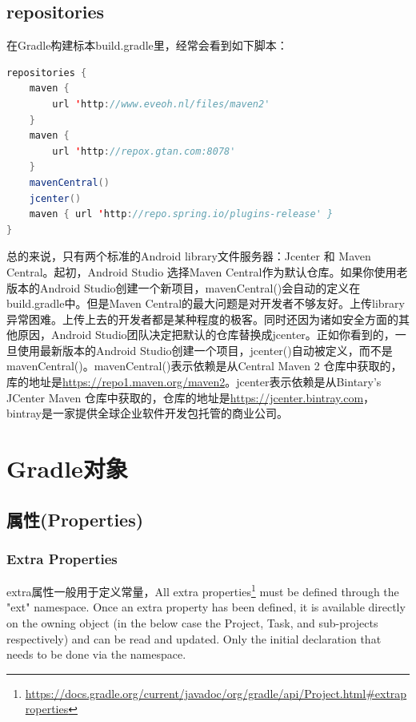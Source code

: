 \documentclass[letter]{book}
\begin{document}
\subsection{repositories}

在Gradle构建标本build.gradle里，经常会看到如下脚本：

\begin{lstlisting}[language=Java]
repositories {
	maven {
		url 'http://www.eveoh.nl/files/maven2'
	}
	maven {
		url 'http://repox.gtan.com:8078'
	}
	mavenCentral()
	jcenter()
	maven { url 'http://repo.spring.io/plugins-release' }
}
\end{lstlisting}

总的来说，只有两个标准的Android library文件服务器：Jcenter 和 Maven Central。起初，Android Studio 选择Maven Central作为默认仓库。如果你使用老版本的Android Studio创建一个新项目，mavenCentral()会自动的定义在build.gradle中。但是Maven Central的最大问题是对开发者不够友好。上传library异常困难。上传上去的开发者都是某种程度的极客。同时还因为诸如安全方面的其他原因，Android Studio团队决定把默认的仓库替换成jcenter。正如你看到的，一旦使用最新版本的Android Studio创建一个项目，jcenter()自动被定义，而不是mavenCentral()。mavenCentral()表示依赖是从Central Maven 2 仓库中获取的，库的地址是\url{https://repo1.maven.org/maven2}。jcenter表示依赖是从Bintary’s JCenter Maven 仓库中获取的，仓库的地址是\url{https://jcenter.bintray.com}，bintray是一家提供全球企业软件开发包托管的商业公司。

\section{Gradle对象}

\subsection{属性(Properties)}

\subsubsection{Extra Properties}

extra属性一般用于定义常量，All extra properties\footnote{\url{https://docs.gradle.org/current/javadoc/org/gradle/api/Project.html\#extraproperties}} must be defined through the "ext" namespace. Once an extra property has been defined, it is available directly on the owning object (in the below case the Project, Task, and sub-projects respectively) and can be read and updated. Only the initial declaration that needs to be done via the namespace.
\end{document}
